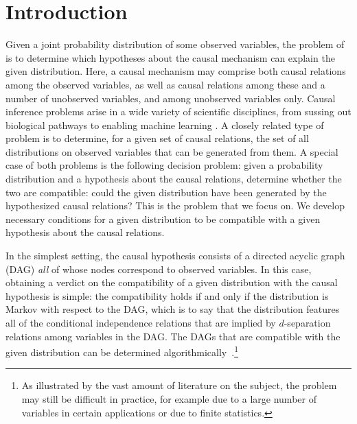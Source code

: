 \documentclass[aps,english,10pt,superscriptaddress,onecolumn,twoside,longbibliography,pra,floatfix,fleqn,nofootinbib]{revtex4-1}%
\newcommand*{\tblue}[1]{{\color{MidnightBlue}{\textbf{#1}}}}
\theoremstyle{definition}
\newcounter{example}[section]
\begin{document}
\maketitle
\tableofcontents

\section{Introduction}

Given a joint probability distribution of some observed variables, the problem of \tblue{causal inference} is to determine which hypotheses about the causal mechanism can explain the given distribution. Here, a causal mechanism may comprise both causal relations among the observed variables, as well as causal relations among these and a number of unobserved variables, and among unobserved variables only. Causal inference problems arise in a wide variety of scientific disciplines, from sussing out biological pathways to enabling machine learning \cite{pearl2009causality,spirtes2011causation,studeny2005probabilistic,koller2009probabilistic}. A closely related type of problem is to determine, for a given set of causal relations, the set of all distributions on observed variables that can be generated from them.   
A special case of both problems is the following decision problem: given a probability distribution and a hypothesis about the causal relations, determine whether the two are compatible: could the given distribution have been generated by the hypothesized causal relations? This is the problem that we focus on.
We develop necessary conditions for a given distribution to be compatible with a given hypothesis about the causal relations.

In the simplest setting, the causal hypothesis consists of a directed acyclic graph (DAG) {\em all} of whose nodes correspond to observed variables. In this case, obtaining a verdict on the compatibility of a given distribution with the causal hypothesis is simple: the compatibility holds if and only if the distribution is Markov with respect to the DAG, which is to say that the distribution features all of the conditional independence relations that are implied by $d$-separation relations among variables in the DAG. The DAGs that are compatible with the given distribution can be determined algorithmically~\cite{pearl2009causality}.\footnote{As illustrated by the vast amount of literature on the subject, the problem may still be difficult in practice, for example due to a large number of variables in certain applications or due to finite statistics.}
\end{document}
